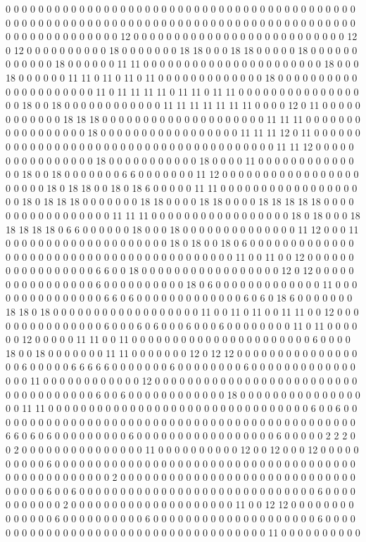 0 0 0 0 0 0 0 0 0 0 0 0 0 0 0 0 0 0 0 0 0 0 0 0 0 0 0 0 0 0 0 0 0 0 0 0 0 0 0 0 0 0 0 0 0 0 0 0 0 0 0 0 0 0 0 0 0 0 0 0 0 0 0 0 0 0 0 0 0 0 0 0 0 0 0 0 0 0 0 0 0 0 0 0 0 0 0 0 0 0 0 0 0 0 0 0 0 0 0 0 12 0 0 0 0 0 0 0 0 0 0 0 0 0 0 0 0 0 0 0 0 0 0 0 0 0 0 12 0 12 0 0 0 0 0 0 0 0 0 0 18 0 0 0 0 0 0 0 18 18 0 0 0 18 18 0 0 0 0 0 18 0 0 0 0 0 0 0 0 0 0 0 0 18 0 0 0 0 0 0 11 11 0 0 0 0 0 0 0 0 0 0 0 0 0 0 0 0 0 0 0 0 0 0 18 0 0 0 18 0 0 0 0 0 0 11 11 0 11 0 11 0 11 0 0 0 0 0 0 0 0 0 0 0 0 0 18 0 0 0 0 0 0 0 0 0 0 0 0 0 0 0 0 0 0 0 0 0 11 0 11 11 11 11 0 11 11 0 11 11 0 0 0 0 0 0 0 0 0 0 0 0 0 0 0 0 0 18 0 0 18 0 0 0 0 0 0 0 0 0 0 0 0 11 11 11 11 11 11 11 0 0 0 0 12 0 11 0 0 0 0 0 0 0 0 0 0 0 0 18 18 18 0 0 0 0 0 0 0 0 0 0 0 0 0 0 0 0 0 0 0 0 11 11 11 0 0 0 0 0 0 0 0 0 0 0 0 0 0 0 0 0 18 0 0 0 0 0 0 0 0 0 0 0 0 0 0 0 0 0 11 11 11 12 0 11 0 0 0 0 0 0 0 0 0 0 0 0 0 0 0 0 0 0 0 0 0 0 0 0 0 0 0 0 0 0 0 0 0 0 0 0 0 0 0 11 11 12 0 0 0 0 0 0 0 0 0 0 0 0 0 0 0 0 18 0 0 0 0 0 0 0 0 0 0 0 18 0 0 0 0 11 0 0 0 0 0 0 0 0 0 0 0 0 0 0 18 0 0 18 0 0 0 0 0 0 0 6 6 0 0 0 0 0 0 0 11 12 0 0 0 0 0 0 0 0 0 0 0 0 0 0 0 0 0 0 0 0 0 0 18 0 18 18 0 0 18 0 18 6 0 0 0 0 0 11 11 0 0 0 0 0 0 0 0 0 0 0 0 0 0 0 0 0 0 0 18 0 18 18 18 0 0 0 0 0 0 0 18 18 0 0 0 0 18 18 0 0 0 0 18 18 18 18 18 0 0 0 0 0 0 0 0 0 0 0 0 0 0 0 0 0 11 11 11 0 0 0 0 0 0 0 0 0 0 0 0 0 0 0 0 0 18 0 18 0 0 0 18 18 18 18 18 0 6 6 0 0 0 0 0 0 18 0 0 0 18 0 0 0 0 0 0 0 0 0 0 0 0 0 0 11 12 0 0 0 11 0 0 0 0 0 0 0 0 0 0 0 0 0 0 0 0 0 0 0 0 18 0 18 0 0 18 0 6 0 0 0 0 0 0 0 0 0 0 0 0 0 0 0 0 0 0 0 0 0 0 0 0 0 0 0 0 0 0 0 0 0 0 0 0 0 0 0 0 0 11 0 0 11 0 0 12 0 0 0 0 0 0 0 0 0 0 0 0 0 0 0 0 0 6 6 0 0 18 0 0 0 0 0 0 0 0 0 0 0 0 0 0 0 0 0 12 0 12 0 0 0 0 0 0 0 0 0 0 0 0 0 0 0 0 6 0 0 0 0 0 0 0 0 0 0 18 0 6 0 0 0 0 0 0 0 0 0 0 0 0 0 11 0 0 0 0 0 0 0 0 0 0 0 0 0 0 0 6 6 0 6 0 0 0 0 0 0 0 0 0 0 0 0 0 6 0 6 0 18 6 0 0 0 0 0 0 0 18 18 0 18 0 0 0 0 0 0 0 0 0 0 0 0 0 0 0 0 0 0 11 0 0 11 0 11 0 0 11 11 0 0 12 0 0 0 0 0 0 0 0 0 0 0 0 0 0 0 6 0 0 0 6 0 6 0 0 0 6 0 0 0 6 0 0 0 0 0 0 0 0 11 0 11 0 0 0 0 0 0 12 0 0 0 0 0 11 11 0 0 11 0 0 0 0 0 0 0 0 0 0 0 0 0 0 0 0 0 0 0 0 0 0 6 0 0 0 0 18 0 0 18 0 0 0 0 0 0 0 11 11 0 0 0 0 0 0 0 12 0 12 12 0 0 0 0 0 0 0 0 0 0 0 0 0 0 0 0 0 6 0 0 0 0 0 6 6 6 6 6 0 0 0 0 0 0 0 6 0 0 0 0 0 0 0 0 6 0 0 0 0 0 0 0 0 0 0 0 0 0 0 0 0 11 0 0 0 0 0 0 0 0 0 0 0 0 12 0 0 0 0 0 0 0 0 0 0 0 0 0 0 0 0 0 0 0 0 0 0 0 0 0 0 0 0 0 0 0 0 0 0 0 0 6 0 0 6 0 0 0 0 0 0 0 0 0 0 0 0 18 0 0 0 0 0 0 0 0 0 0 0 0 0 0 0 0 0 11 11 0 0 0 0 0 0 0 0 0 0 0 0 0 0 0 0 0 0 0 0 0 0 0 0 0 0 0 0 0 0 0 0 6 0 0 6 0 0 0 0 0 0 0 0 0 0 0 0 0 0 0 0 0 0 0 0 0 0 0 0 0 0 0 0 0 0 0 0 0 0 0 0 0 0 0 0 0 0 0 0 0 6 6 0 6 0 6 0 0 0 0 0 0 0 0 0 6 0 0 0 0 0 0 0 0 0 0 0 0 0 0 0 0 0 6 0 0 0 0 0 2 2 2 0 0 2 0 0 0 0 0 0 0 0 0 0 0 0 0 0 0 11 0 0 0 0 0 0 0 0 0 0 12 0 0 12 0 0 0 12 0 0 0 0 0 0 0 0 0 0 6 0 0 0 0 0 0 0 0 0 0 0 0 0 0 0 0 0 0 0 0 0 0 0 0 0 0 0 0 0 0 0 0 0 0 0 0 0 0 0 0 0 0 0 0 0 0 0 0 0 0 2 0 0 0 0 0 0 0 0 0 0 0 0 0 0 0 0 0 0 0 0 0 0 0 0 0 0 0 0 0 0 0 0 0 0 6 0 0 6 0 0 0 0 0 0 0 0 0 0 0 0 0 0 0 0 0 0 0 0 0 0 0 0 0 0 0 0 0 6 0 0 0 0 0 0 0 0 0 0 0 2 0 0 0 0 0 0 0 0 0 0 0 0 0 0 0 0 0 0 0 0 11 0 0 12 12 0 0 0 0 0 0 0 0 0 0 0 0 0 0 6 0 0 0 0 0 0 0 0 0 0 6 0 0 0 0 0 0 0 0 0 0 0 0 0 0 0 0 0 0 0 0 6 0 0 0 0 0 0 0 0 0 0 0 0 0 0 0 0 0 0 0 0 0 0 0 0 0 0 0 0 0 0 0 0 0 0 0 0 11 0 0 0 0 0 0 0 0 0 0 
